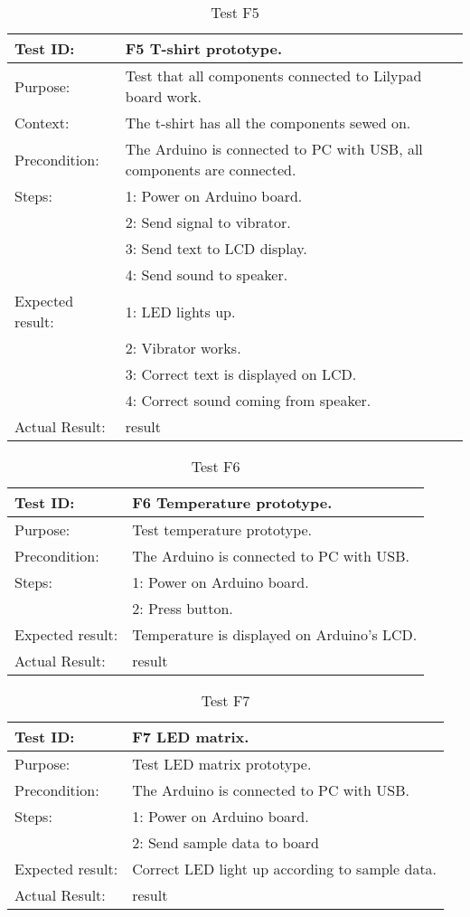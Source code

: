\begin{table}[h!]
\begin{tabular}{|l|p{10cm}|}
\hline Test ID: & F5 T-shirt prototype. \\ 
\hline Purpose: & Test that all components connected to Lilypad board work. \\ 
\hline Context: & The t-shirt has all the components sewed on. \\ 
\hline Precondition: & The Arduino is connected to PC with USB, all components are connected. \\ 
\hline
Steps:
  & 1: Power on Arduino board.\\ 
  & 2: Send signal to vibrator. \\ 
  & 3: Send text to LCD display. \\
  & 4: Send sound to speaker.\\
\hline
Expected result:
  & 1: LED lights up.\\ 
  & 2: Vibrator works. \\ 
  & 3: Correct text is displayed on LCD. \\ 
  & 4: Correct sound coming from speaker. \\
\hline
Actual Result:
  & result \\
\hline
\end{tabular}
\caption{Test F5}
\label{tbl:f5test}
\end{table}

\begin{table}[h!]
\begin{tabular}{|l|p{10cm}|}
\hline Test ID: & F6 Temperature prototype. \\ 
\hline Purpose: & Test temperature prototype. \\ 
\hline Precondition: & The Arduino is connected to PC with USB. \\ 
\hline
Steps:
  & 1: Power on Arduino board.\\ 
  & 2: Press button. \\ 
\hline
Expected result:
  & Temperature is displayed on Arduino's LCD.\\ 
\hline
Actual Result:
  & result \\
\hline
\end{tabular}
\caption{Test F6}
\label{tbl:f6test}
\end{table}

\begin{table}[h!]
\begin{tabular}{|l|p{10cm}|}
\hline Test ID: & F7 LED matrix. \\ 
\hline Purpose: & Test LED matrix prototype. \\ 
\hline Precondition: & The Arduino is connected to PC with USB. \\ 
\hline
Steps:
  & 1: Power on Arduino board.\\ 
  & 2: Send sample data to board \\ 
\hline
Expected result:
  & Correct LED light up according to sample data.\\ 
\hline
Actual Result:
  & result \\
\hline
\end{tabular}
\caption{Test F7}
\label{tbl:f7test}
\end{table}

